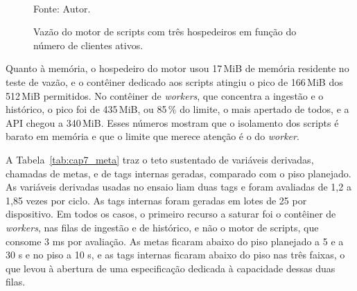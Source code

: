 \begin{figure}[H]
    \centering
    \caption{Vazão do motor de scripts com três hospedeiros em função do número de clientes ativos.}
    \label{fig:cap7_clientes}
    \vspace{0.4cm}
    \vspace{0.2cm} \\
    Fonte: Autor.
\end{figure}

\par Quanto à memória, o hospedeiro do motor usou 17\,MiB de memória residente no teste de vazão, e o contêiner dedicado aos scripts atingiu o pico de 166\,MiB dos 512\,MiB permitidos. No contêiner de \emph{workers}, que concentra a ingestão e o histórico, o pico foi de 435\,MiB, ou 85\,\% do limite, o mais apertado de todos, e a API chegou a 340\,MiB. Esses números mostram que o isolamento dos scripts é barato em memória e que o limite que merece atenção é o do \emph{worker}.

\par A Tabela~\ref{tab:cap7_meta} traz o teto sustentado de variáveis derivadas, chamadas de metas, e de tags internas geradas, comparado com o piso planejado. As variáveis derivadas usadas no ensaio liam duas tags e foram avaliadas de 1,2 a 1,85 vezes por ciclo. As tags internas foram geradas em lotes de 25 por dispositivo. Em todos os casos, o primeiro recurso a saturar foi o contêiner de \emph{workers}, nas filas de ingestão e de histórico, e não o motor de scripts, que consome 3 ms por avaliação. As metas ficaram abaixo do piso planejado a 5 e a 30 s e no piso a 10 s, e as tags internas ficaram abaixo do piso nas três faixas, o que levou à abertura de uma especificação dedicada à capacidade dessas duas filas.

